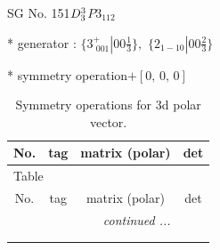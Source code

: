 \documentclass[fleqn,8pt]{jsarticle}
\begin{document}
\setcounter{MaxMatrixCols}{32}

\renewcommand{\tablename}{Table~}
\renewcommand{\figurename}{Figure~}
\begin{center}
\LARGE
SG No. 151\quad$D_{\rm 3}^{3}$\quad$P3_112$\quad[ trigonal ]
\end{center}

* generator : $\{3^{+}_{\,\,001}|0 0 \frac{1}{3}\},\,\,\{2{}_{1-10}|0 0 \frac{2}{3}\}$

* symmetry operation\quad$+\left[ 0,\, 0,\, 0 \right]$
\renewcommand{\arraystretch}{1.3}
\begin{longtable}{cccc}
\caption{Symmetry operations for 3d polar vector.}
 \\
 \hline \hline
No. & tag & matrix (polar) & det \\ \hline \endfirsthead

\multicolumn{3}{l}{\tablename\ \thetable{}} \\
 \hline \hline
No. & tag & matrix (polar) & det \\ \hline \endhead

 \hline \hline
\multicolumn{3}{r}{\footnotesize\it continued ...} \\ \endfoot

 \hline \hline
\multicolumn{3}{r}{} \\ \endlastfoot


\end{longtable}
\end{document}

